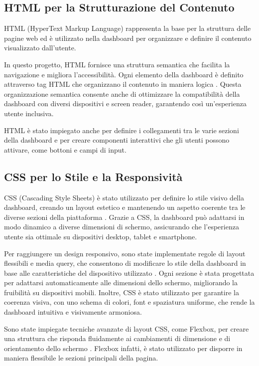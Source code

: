 \subsection{HTML per la Strutturazione del Contenuto}
HTML (HyperText Markup Language) rappresenta la base per la struttura delle pagine web ed è utilizzato nella dashboard per organizzare e definire il contenuto visualizzato dall’utente.

In questo progetto, HTML fornisce una struttura semantica che facilita la navigazione e migliora l'accessibilità. Ogni elemento della dashboard è definito attraverso tag HTML che organizzano il contenuto in maniera logica \cite{robbins2012learning}. Questa organizzazione semantica consente anche di ottimizzare la compatibilità della dashboard con diversi dispositivi e screen reader, garantendo così un'esperienza utente inclusiva.

HTML è stato impiegato anche per definire i collegamenti tra le varie sezioni della dashboard e per creare componenti interattivi che gli utenti possono attivare, come bottoni e campi di input.

\subsection{CSS per lo Stile e la Responsività}
CSS (Cascading Style Sheets) è stato utilizzato per definire lo stile visivo della dashboard, creando un layout estetico e mantenendo un aspetto coerente tra le diverse sezioni della piattaforma \cite{meyer2007css}. Grazie a CSS, la dashboard può adattarsi in modo dinamico a diverse dimensioni di schermo, assicurando che l’esperienza utente sia ottimale su dispositivi desktop, tablet e smartphone.

Per raggiungere un design responsivo, sono state implementate regole di layout flessibili e media query, che consentono di modificare lo stile della dashboard in base alle caratteristiche del dispositivo utilizzato \cite{marcotte2011responsive}. Ogni sezione è stata progettata per adattarsi automaticamente alle dimensioni dello schermo, migliorando la fruibilità su dispositivi mobili. Inoltre, CSS è stato utilizzato per garantire la coerenza visiva, con uno schema di colori, font e spaziatura uniforme, che rende la dashboard intuitiva e visivamente armoniosa.

Sono state impiegate tecniche avanzate di layout CSS, come Flexbox, per creare una struttura che risponda fluidamente ai cambiamenti di dimensione e di orientamento dello schermo \cite{kevin2020flexbox}. Flexbox infatti, è stato utilizzato per disporre in maniera flessibile le sezioni principali della pagina.

